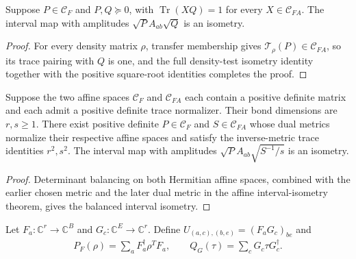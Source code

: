 \begin{lemma}
    \label{thm:mpu_affine_interval_isometry}
    \leanok
    Suppose $P\in\mathcal C_F$ and $P,Q\succeq0$, with
    $\operatorname{Tr}(XQ)=1$ for every $X\in\mathcal C_{FA}$.
    The interval map with amplitudes $\sqrt P A_{ab}\sqrt Q$ is
    an isometry.
\end{lemma}
\begin{proof}\leanok
    For every density matrix $\rho$, transfer membership gives
    $\mathcal T_\rho(P)\in\mathcal C_{FA}$, so its trace pairing
    with $Q$ is one, and the full density-test isometry identity
    together with the positive square-root identities completes the proof.
\end{proof}

\begin{lemma}
    \label{thm:mpu_two_cut_balanced_isometry}
    \leanok
    Suppose the two affine spaces $\mathcal C_F$ and $\mathcal C_{FA}$
    each contain a positive definite matrix and each admit a positive
    definite trace normalizer. Their bond dimensions are $r,s\geq1$.
    There exist positive definite $P\in\mathcal C_F$ and
    $S\in\mathcal C_{FA}$ whose dual metrics normalize their respective
    affine spaces and satisfy the inverse-metric trace identities
    $r^2,s^2$. The interval map with amplitudes
    $\sqrt P A_{ab}\sqrt{S^{-1}/s}$ is an isometry.
\end{lemma}
\begin{proof}\leanok
    Determinant balancing on both Hermitian affine spaces, combined
    with the earlier chosen metric and the later dual metric in
    the affine interval-isometry theorem, gives the balanced interval isometry.
\end{proof}

\begin{definition}
    \label{def:mpu_finite_cut_cap_grams}
    \leanok
    Let $F_a:\mathbb C^r\to\mathbb C^B$ and
    $G_c:\mathbb C^E\to\mathbb C^r$. Define
    $U_{(a,c),(b,e)}=(F_aG_c)_{be}$ and
    \begin{align}
        P_F(\rho)=\sum_aF_a^\dagger\rho^T F_a,\qquad
        Q_G(\tau)=\sum_cG_c\tau G_c^\dagger.
    \end{align}
\end{definition}

